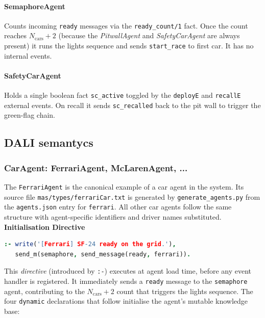 \paragraph{SemaphoreAgent}
Counts incoming \texttt{ready} messages via the \texttt{ready\_count/1} fact.
Once the count reaches $N_\text{cars} + 2$ (because the \textit{PitwallAgent} and \textit{SafetyCarAgent} are always present) it runs the lights sequence and
sends \texttt{start\_race} to first car.
It has no internal events.

\paragraph{SafetyCarAgent}
Holds a single boolean fact \texttt{sc\_active} toggled by the
\texttt{deployE} and \texttt{recallE} external events.
On recall it sends \texttt{sc\_recalled} back to the pit wall to trigger the
green-flag chain.

\subsection{DALI semantycs}

\subsubsection{CarAgent: FerrariAgent, McLarenAgent, ...}

The \texttt{FerrariAgent} is the canonical example of a car agent in the
system. Its source file \texttt{mas/types/ferrariCar.txt} is generated by
\texttt{generate\_agents.py} from the \texttt{agents.json} entry for
\texttt{ferrari}. All other car agents follow the same structure with
agent-specific identifiers and driver names substituted.\\

\textbf{Initialisation Directive}

\begin{minipage}{\linewidth}
\begin{lstlisting}[language=Prolog]
:- write('[Ferrari] SF-24 ready on the grid.'),
   send_m(semaphore, send_message(ready, ferrari)).
\end{lstlisting}
\end{minipage}

\noindent
This \emph{directive} (introduced by \texttt{:-}) executes at agent load time, before any event handler is registered. It immediately sends a \texttt{ready} message to the \texttt{semaphore} agent, contributing to the $N_\text{cars}+2$ count that triggers the lights sequence. The four \texttt{dynamic} declarations that follow initialise the agent's mutable knowledge base:

